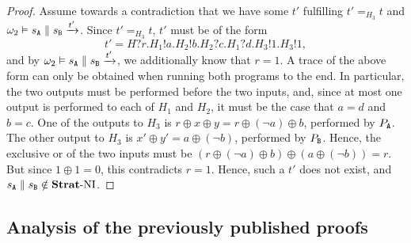 \documentclass[preprint,5p,twocolumn]{elsarticle}
\begin{document}
\begin{proof}
  Assume towards a contradiction that we have some $t'$ fulfilling $t' =_{H_3} t$
  and $\omega_2 \vDash s_{\mathtt{A}} \parallel s_{\mathtt{B}} \xrightarrow{t'}$. Since $t' =_{H_3} t$, $t'$ must
  be of the form
  $$t' = H?r.H_1!a.H_2!b.H_2?c.H_1?d.H_3!1.H_3!1,$$
  and by $\omega_2 \vDash s_{\mathtt{A}} \parallel s_{\mathtt{B}} \xrightarrow{t'}$, we additionally know that $r = 1$.
  A trace of the above form can only be obtained when running both programs to the end. In
  particular, the two outputs must be performed before the two inputs, and, since at most
  one output is performed to each of $H_1$ and $H_2$, it must be the case that $a = d$ and $b = c$.
  One of the outputs to $H_3$ is $r \oplus x \oplus y = r \oplus (\neg a) \oplus b$, performed
  by $P_{\mathtt{A}}$. The other output to $H_3$ is $x' \oplus y' = a \oplus (\neg b)$, performed by $P_{\mathtt{B}}$.
  Hence, the exclusive or of the two inputs must be $(r \oplus (\neg a) \oplus b) \oplus (a \oplus (\neg b))=r$. But since $1 \oplus 1 = 0$, this contradicts $r = 1$. Hence, such a $t'$ does
  not exist, and $s_{\mathtt{A}} \parallel s_{\mathtt{B}} \notin \mathbf{Strat}\text{-}\mathrm{NI}$.
  
\end{proof}

\subsection{Analysis of the previously published proofs}
\end{document}
